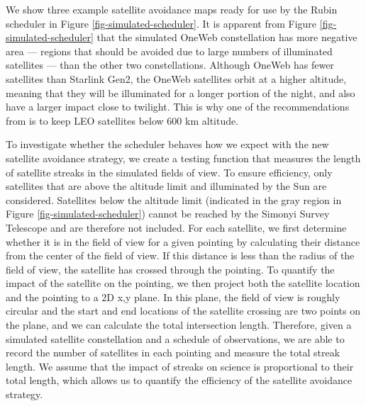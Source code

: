 \documentclass[twocolumn]{aastex631}
\begin{document}
\begin{figure*}[ht!]
\caption{Satellite avoidance maps constructed for the Rubin scheduler for each simulated constellation. Each is for a twilight observation period of 90 minutes (beginning after sunset with a Sun altitude of $-17.1$ degrees). The map projections are rotated so zenith is in the center of the image. Darker regions have more illuminated satellites and therefore more negative weighting. By varying the dodging weight placed on these maps, the scheduler will more actively avoid regions of the sky where satellites could streak images.
\label{fig-simulated-scheduler}
}
\end{figure*}

We show three example satellite avoidance maps ready for use by the Rubin scheduler in Figure \ref{fig-simulated-scheduler}. It is apparent from Figure \ref{fig-simulated-scheduler} that the simulated OneWeb constellation has more negative area --- regions that should be avoided due to large numbers of illuminated satellites --- than the other two constellations. Although OneWeb has fewer satellites than Starlink Gen2, the OneWeb satellites orbit at a higher altitude, meaning that they will be illuminated for a longer portion of the night, and also have a larger impact close to twilight. This is why one of the recommendations from \citet{satcon1} is to keep LEO satellites below 600 km altitude.

To investigate whether the scheduler behaves how we expect with the new satellite avoidance strategy, we create a testing function that measures the length of satellite streaks in the simulated fields of view. To ensure efficiency, only satellites that are above the altitude limit and illuminated by the Sun are considered. Satellites below the altitude limit (indicated in the gray region in Figure \ref{fig-simulated-scheduler}) cannot be reached by the Simonyi Survey Telescope and are therefore not included. For each satellite, we first determine whether it is in the field of view for a given pointing by calculating their distance from the center of the field of view. If this distance is less than the radius of the field of view, the satellite has crossed through the pointing. To quantify the impact of the satellite on the pointing, we then project both the satellite location and the pointing to a 2D x,y plane. In this plane, the field of view is roughly circular and the start and end locations of the satellite crossing are two points on the plane, and we can calculate the total intersection length. Therefore, given a simulated satellite constellation and a schedule of observations, we are able to record the number of satellites in each pointing and measure the total streak length. We assume that 
the impact of streaks on science is proportional to their total length, which allows us to quantify the efficiency of the satellite avoidance strategy. 
\end{document}

